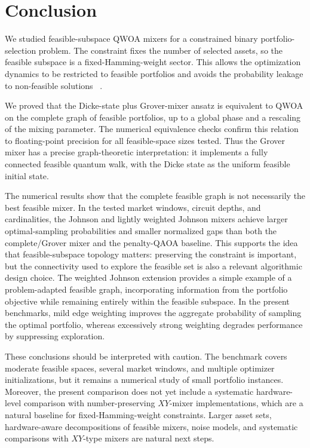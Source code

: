 
\section{\label{sec:conclusion}Conclusion}

We studied feasible-subspace QWOA mixers for a constrained binary
portfolio-selection problem. The constraint fixes the number of selected
assets, so the feasible subspace is a fixed-Hamming-weight sector. This allows
the optimization dynamics to be restricted to feasible portfolios and avoids
the probability leakage to non-feasible solutions
~\cite{Hadfield2019,Slate2021}.

We proved that the Dicke-state plus Grover-mixer ansatz is equivalent to QWOA
on the complete graph of feasible portfolios, up to a global phase and a
rescaling of the mixing parameter. The numerical equivalence checks confirm
this relation to floating-point precision for all feasible-space sizes tested.
Thus the Grover mixer has a precise graph-theoretic interpretation: it
implements a fully connected feasible quantum walk, with the Dicke state as the
uniform feasible initial state.

The numerical results show that the complete feasible graph is not necessarily the best feasible mixer. In the tested market windows, circuit depths, and cardinalities, the Johnson and lightly weighted Johnson mixers achieve larger optimal-sampling probabilities and smaller normalized gaps than both the complete/Grover mixer and the penalty-QAOA baseline. This supports the idea that feasible-subspace topology matters: preserving the constraint is important, but the connectivity used to explore the feasible set is also a relevant algorithmic design choice.
The weighted Johnson extension provides a simple example of a problem-adapted feasible graph, incorporating information from the portfolio objective while remaining entirely within the feasible subspace. In the present benchmarks, mild edge weighting improves the aggregate probability of sampling the optimal portfolio, whereas excessively strong weighting degrades performance by suppressing exploration.

These conclusions should be interpreted with caution. The benchmark covers
moderate feasible spaces, several market windows, and multiple optimizer
initializations, but it remains a numerical study of small portfolio instances.
Moreover, the present comparison does not yet include a systematic
hardware-level comparison with number-preserving \(XY\)-mixer implementations,
which are a natural baseline for fixed-Hamming-weight constraints. Larger asset
sets, hardware-aware decompositions of feasible mixers, noise models, and
systematic comparisons with \(XY\)-type mixers are natural next steps.

